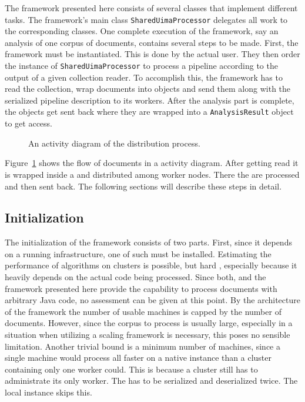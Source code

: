 The framework presented here consists of several classes that implement different tasks. The framework's main class \lstinline|SharedUimaProcessor| delegates all work to the corresponding classes. One complete execution of the framework, say an analysis of one corpus of documents, contains several steps to be made. First, the framework must be instantiated. This is done by the actual user. They then order the instance of \lstinline|SharedUimaProcessor| to process a pipeline according to the output of a given collection reader. To accomplish this, the framework has to read the collection, wrap documents into \cas{} objects and send them along with the serialized pipeline description to its workers. After the analysis part is complete, the \cas{} objects get sent back where they are wrapped into a \lstinline|AnalysisResult| object to get access. 
\begin{figure}[!htb]
	\centering
	\resizebox{0.8\linewidth}{!}{\small}
	\caption[An UML activity diagram of the CAS distribution process.]{An \uml{} activity diagram of the \cas{} distribution process.}
	\label{fig:sup_act}
\end{figure}

Figure~\ref{fig:sup_act} shows the flow of documents in a \uml{} activity diagram. After getting read it is wrapped inside a \cas{} and distributed among worker nodes. There the \cas{} are processed and then sent back. The following sections will describe these steps in detail.

\subsection{Initialization}
\label{sec:init}
The initialization of the framework consists of two parts. First, since it depends on a running \spark{} infrastructure, one of such must be installed. Estimating the performance of algorithms on \spark{} clusters is possible, but hard \cite{wang2015performance,gopalani2015comparing}, especially because it heavily depends on the actual code being processed. Since both, \uima{} and the framework presented here provide the capability to process documents with arbitrary Java code, no assessment can be given at this point. By the architecture of the framework the number of usable machines is capped by the number of documents. However, since the corpus to process is usually large, especially in a situation when utilizing a scaling framework is necessary, this poses no sensible limitation. Another trivial bound is a minimum number of machines, since a single machine would process all \cas{} faster on a native \uima{} instance than a \spark{} cluster containing only one worker could. This is because a \spark{} cluster still has to administrate its only worker. The \cas{} has to be serialized and deserialized twice. The local \uima{} instance skips this.

